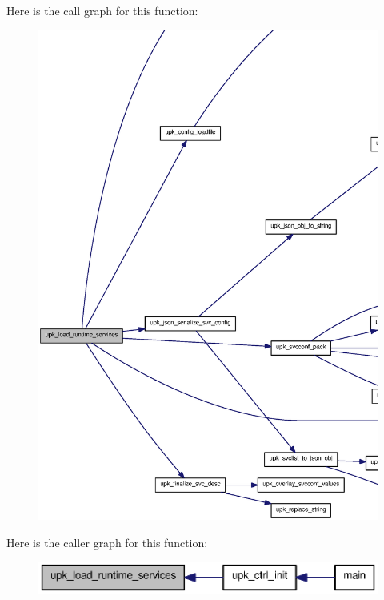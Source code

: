 Here is the call graph for this function:\nopagebreak
\begin{figure}[H]
\begin{center}
\leavevmode
\includegraphics[width=400pt]{group__config__impl_gaad96df378fe382df9bb37e2f21b62ee9_cgraph}
\end{center}
\end{figure}




Here is the caller graph for this function:\nopagebreak
\begin{figure}[H]
\begin{center}
\leavevmode
\includegraphics[width=360pt]{group__config__impl_gaad96df378fe382df9bb37e2f21b62ee9_icgraph}
\end{center}
\end{figure}


